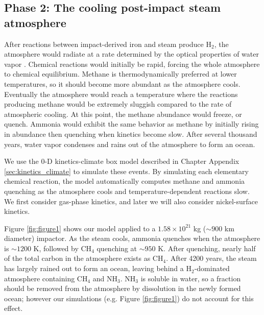 \subsection{Phase 2: The cooling post-impact steam atmosphere} \label{sec:phase2}

After reactions between impact-derived iron and steam produce H$_2$, the atmosphere would radiate at a rate determined by the optical properties of water vapor \citep{Zahnle_2020}. Chemical reactions would initially be rapid, forcing the whole atmosphere to chemical equilibrium. Methane is thermodynamically preferred at lower temperatures, so it should become more abundant as the atmosphere cools. Eventually the atmosphere would reach a temperature where the reactions producing methane would be extremely sluggish compared to the rate of atmospheric cooling. At this point, the methane abundance would freeze, or quench. Ammonia would exhibit the same behavior as methane by initially rising in abundance then quenching when kinetics become slow. After several thousand years, water vapor condenses and rains out of the atmosphere to form an ocean.

We use the 0-D kinetics-climate box model described in Chapter Appendix \ref{sec:kinetics_climate} to simulate these events. By simulating each elementary chemical reaction, the model automatically computes methane and ammonia quenching as the atmosphere cools and temperature-dependent reactions slow. We first consider gas-phase kinetics, and later we will also consider nickel-surface kinetics.

Figure \ref{fig:figure1} shows our model applied to a $1.58 \times 10^{21}$ kg ($\sim 900$ km diameter) impactor. As the steam cools, ammonia quenches when the atmosphere is $\sim 1200$ K, followed by CH$_4$ quenching at $\sim 950$ K. After quenching, nearly half of the total carbon in the atmosphere exists as CH$_4$. After 4200 years, the steam has largely rained out to form an ocean, leaving behind a H$_2$-dominated atmosphere containing CH$_4$ and NH$_3$. NH$_3$ is soluble in water, so a fraction should be removed from the atmosphere by dissolution in the newly formed ocean; however our simulations (e.g. Figure \ref{fig:figure1}) do not account for this effect. 


